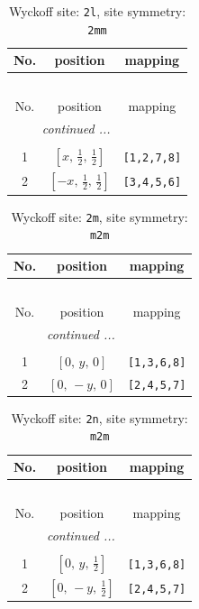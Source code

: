 \documentclass[fleqn,8pt]{jsarticle}
\begin{document}
\begin{longtable}{ccc}
\caption{Wyckoff site: {\tt 2l}, site symmetry: {\tt 2mm}}
 \\
 \hline \hline
No. & position & mapping \\ \hline \endfirsthead

\multicolumn{2}{l}{\tablename\ \thetable{}} \\
 \hline \hline
No. & position & mapping \\ \hline \endhead

 \hline \hline
\multicolumn{2}{r}{\footnotesize\it continued ...} \\ \endfoot

 \hline \hline
\multicolumn{2}{r}{} \\ \endlastfoot

1 & $\left[ x,\, \frac{1}{2},\, \frac{1}{2} \right]$ & {\tt [1,2,7,8]} \\ \hline
2 & $\left[ - x,\, \frac{1}{2},\, \frac{1}{2} \right]$ & {\tt [3,4,5,6]} \\
\end{longtable}
\renewcommand{\arraystretch}{1.2}
\begin{longtable}{ccc}
\caption{Wyckoff site: {\tt 2m}, site symmetry: {\tt m2m}}
 \\
 \hline \hline
No. & position & mapping \\ \hline \endfirsthead

\multicolumn{2}{l}{\tablename\ \thetable{}} \\
 \hline \hline
No. & position & mapping \\ \hline \endhead

 \hline \hline
\multicolumn{2}{r}{\footnotesize\it continued ...} \\ \endfoot

 \hline \hline
\multicolumn{2}{r}{} \\ \endlastfoot

1 & $\left[ 0,\, y,\, 0 \right]$ & {\tt [1,3,6,8]} \\ \hline
2 & $\left[ 0,\, - y,\, 0 \right]$ & {\tt [2,4,5,7]} \\
\end{longtable}
\renewcommand{\arraystretch}{1.2}
\begin{longtable}{ccc}
\caption{Wyckoff site: {\tt 2n}, site symmetry: {\tt m2m}}
 \\
 \hline \hline
No. & position & mapping \\ \hline \endfirsthead

\multicolumn{2}{l}{\tablename\ \thetable{}} \\
 \hline \hline
No. & position & mapping \\ \hline \endhead

 \hline \hline
\multicolumn{2}{r}{\footnotesize\it continued ...} \\ \endfoot

 \hline \hline
\multicolumn{2}{r}{} \\ \endlastfoot

1 & $\left[ 0,\, y,\, \frac{1}{2} \right]$ & {\tt [1,3,6,8]} \\ \hline
2 & $\left[ 0,\, - y,\, \frac{1}{2} \right]$ & {\tt [2,4,5,7]} \\
\end{longtable}
\end{document}
